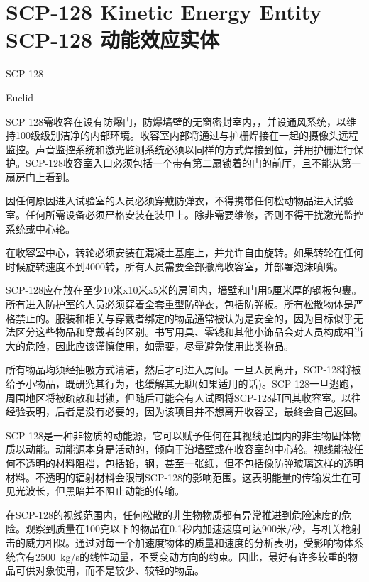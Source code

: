 \chapter[SCP-128 动能效应实体]{
SCP-128 Kinetic Energy Entity\\
SCP-128 动能效应实体
}

\label{chap:SCP-128}

SCP-128

Euclid

SCP-128需收容在设有防爆门，防爆墙壁的无窗密封室内，，并设通风系统，以维持100级级别洁净的内部环境。收容室内部将通过与护栅焊接在一起的摄像头远程监控。声音监控系统和激光监测系统必须以同样的方式焊接到位，并用护栅进行保护。SCP-128收容室入口必须包括一个带有第二扇锁着的门的前厅，且不能从第一扇房门上看到。

因任何原因进入试验室的人员必须穿戴防弹衣，不得携带任何松动物品进入试验室。任何所需设备必须严格安装在装甲上。除非需要维修，否则不得干扰激光监控系统或中心轮。

在收容室中心，转轮必须安装在混凝土基座上，并允许自由旋转。如果转轮在任何时候旋转速度不到4000转，所有人员需要全部撤离收容室，并部署泡沫喷嘴。



SCP-128应存放在至少10米x10米x5米的房间内，墙壁和门用5厘米厚的钢板包裹。所有进入防护室的人员必须穿着全套重型防弹衣，包括防弹板。所有松散物体是严格禁止的。服装和相关与穿戴者绑定的物品通常被认为是安全的，因为目标似乎无法区分这些物品和穿戴者的区别。书写用具、零钱和其他小饰品会对人员构成相当大的危险，因此应该谨慎使用，如需要，尽量避免使用此类物品。

所有物品均须经抽吸方式清洁，然后才可进入房间。一旦人员离开，SCP-128将被给予小物品，既研究其行为，也缓解其无聊(如果适用的话)。SCP-128一旦逃跑，周围地区将被疏散和封锁，但随后可能会有人试图将SCP-128赶回其收容室。以往经验表明，后者是没有必要的，因为该项目并不想离开收容室，最终会自己返回。

SCP-128是一种非物质的动能源，它可以赋予任何在其视线范围内的非生物固体物质以动能。动能源本身是活动的，倾向于沿墙壁或在收容室的中心轮。视线能被任何不透明的材料阻挡，包括铅，钢，甚至一张纸，但不包括像防弹玻璃这样的透明材料。不透明的辐射材料会限制SCP-128的影响范围。这表明能量的传输发生在可见光波长，但黑暗并不阻止动能的传输。

在SCP-128的视线范围内，任何松散的非生物物质都有异常推进到危险速度的危险。观察到质量在100克以下的物品在0.1秒内加速速度可达900米\slash 秒，与机关枪射击的威力相似。通过对每一个加速度物体的质量和速度的分析表明，受影响物体系统含有2500 kg\slash s的线性动量，不受变动方向的约束。因此，最好有许多较重的物品可供对象使用，而不是较少、较轻的物品。

